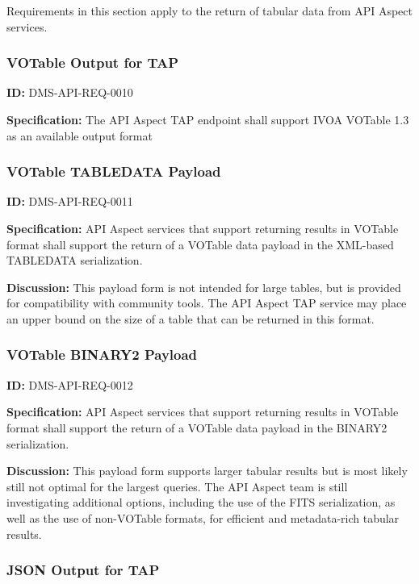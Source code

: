 \documentclass[SE,toc,lsstdraft]{lsstdoc}
\begin{document}
Requirements in this section apply to the return of tabular data from API Aspect services.

\subsubsection{VOTable Output for TAP}

\label{DMS-API-REQ-0010}
\textbf{ID:} DMS-API-REQ-0010

\textbf{Specification:}
The API Aspect TAP endpoint shall support IVOA VOTable 1.3 as an available output format

\subsubsection{VOTable TABLEDATA Payload}

\label{DMS-API-REQ-0011}
\textbf{ID:} DMS-API-REQ-0011

\textbf{Specification:}
API Aspect services that support returning results in VOTable format shall support the return of a VOTable data payload in the XML-based TABLEDATA serialization.

\textbf{Discussion:}
This payload form is not intended for large tables, but is provided for compatibility with community tools.  The API Aspect TAP service may place an upper bound on the size of a table that can be returned in this format.

\subsubsection{VOTable BINARY2 Payload}

\label{DMS-API-REQ-0012}
\textbf{ID:} DMS-API-REQ-0012

\textbf{Specification:}
API Aspect services that support returning results in VOTable format shall support the return of a VOTable data payload in the BINARY2 serialization.

\textbf{Discussion:}
This payload form supports larger tabular results but is most likely still not optimal for the largest queries.  The API Aspect team is still investigating additional options, including the use of the FITS serialization, as well as the use of non-VOTable formats, for efficient and metadata-rich tabular results.

\subsubsection{JSON Output for TAP}
\end{document}
